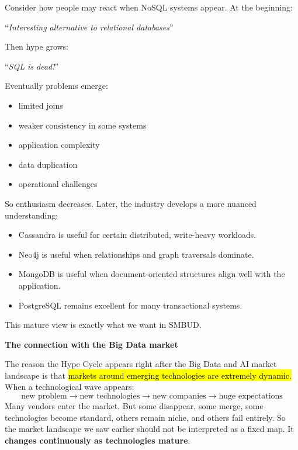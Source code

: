 \highspace
\begin{examplebox}[: NoSQL]
    Consider how people may react when NoSQL systems appear. At the beginning:
    \begin{center}
        ``\emph{Interesting alternative to relational databases}''
    \end{center}
    Then hype grows:
    \begin{center}
        ``\emph{SQL is dead!}''
    \end{center}
    Eventually problems emerge:
    \begin{itemize}
        \item limited joins
        \item weaker consistency in some systems
        \item application complexity
        \item data duplication
        \item operational challenges
    \end{itemize}
    So enthusiasm decreases. Later, the industry develops a more nuanced understanding:
    \begin{itemize}
        \item Cassandra is useful for certain distributed, write-heavy workloads.
        \item Neo4j is useful when relationships and graph traversals dominate.
        \item MongoDB is useful when document-oriented structures align well with the application.
        \item PostgreSQL remains excellent for many transactional systems.
    \end{itemize}
    This mature view is exactly what we want in SMBUD.
\end{examplebox}

\highspace
\begin{flushleft}
    \textcolor{Green3}{ \textbf{The connection with the Big Data market}}
\end{flushleft}
The reason the Hype Cycle appears right after the Big Data and AI market landscape is that \hl{markets around emerging technologies are extremely dynamic.} When a technological wave appears:
\begin{equation*}
    \text{new problem}
    \rightarrow
    \text{new technologies}
    \rightarrow
    \text{new companies}
    \rightarrow
    \text{huge expectations}
\end{equation*}
Many vendors enter the market. But some disappear, some merge, some technologies become standard, others remain niche, and others fail entirely. So the market landscape we saw earlier should not be interpreted as a fixed map. It \textbf{changes continuously as technologies mature}.

